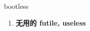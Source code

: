 
\begin{frame}
{\huge bootless}
\begin{center}
\begin{enumerate}\Large
  \item \textbf{无用的 futile, useless}
\end{enumerate}
\end{center}
\end{frame}
